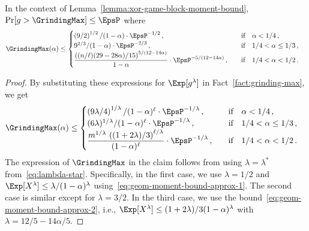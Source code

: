 \begin{corollary}
In the context of Lemma~\ref{lemma:xor-game-block-moment-bound}, $\Pr[g > \GrindingMax] \leq \EpsP$ where 
\begin{align*}
    \GrindingMax(\alpha) &\leq \begin{cases}
        \left( 9/2 \right)^{1/2}/(1-\alpha)\cdot \EpsP^{-1/2}
        \,,&\quad\text{if\quad $\alpha < 1/4$}\,, \\
        9^{2/3}/(1-\alpha)\cdot \EpsP^{-2/3}
        \,,&\quad\text{if\quad $1/4 < \alpha \leq 1/3$}\,, \\
        \dfrac{\left( (n/\ell) (29 - 28\alpha)/15\right)^{5/(12 - 14\alpha)}}{1-\alpha}\cdot \EpsP^{-5/(12 - 14\alpha)}
        \,,&\quad\text{if\quad $1/4 < \alpha < 1/2$}\,.
    \end{cases}
\end{align*}
\end{corollary}
\begin{proof}
By substituting these expressions for $\Exp[g^\lambda]$ in Fact~\ref{fact:grinding-max}, we get 
\begin{align*}
    \GrindingMax(\alpha) &\leq \begin{cases}
        \left( 9\lambda/4 \right)^{1/\lambda}/(1-\alpha)^\ell\cdot \EpsP^{-1/\lambda}
        \,,&\quad\text{if\quad $\alpha < 1/4$}\,, \\
        (6\lambda)^{1/\lambda}/(1-\alpha)^\ell\cdot \EpsP^{-1/\lambda}
        \,,&\quad\text{if\quad $1/4 < \alpha \leq 1/3$}\,, \\
        \dfrac{m^{1/\lambda}\, \left( (1 + 2\lambda)/3\right)^{\ell/\lambda}}{(1-\alpha)^\ell}\cdot \EpsP^{-1/\lambda}
        \,,&\quad\text{if\quad $1/4 < \alpha < 1/2$}\,.
    \end{cases}
\end{align*}
The expression of $\GrindingMax$ in the claim follows from using $\lambda = \lambda^*$ from~\eqref{eq:lambda-star}. 
Specifically, in the first case, we use $\lambda = 1/2$ and $\Exp[X^\lambda] \leq \lambda/(1-\alpha)^\lambda$ using~\eqref{eq:geom-moment-bound-approx-1}. 
The second case is similar except for $\lambda = 3/2$. 
In the third case, we use the bound~\eqref{eq:geom-moment-bound-approx-2}, i.e., 
$\Exp[X^\lambda] \leq (1+2\lambda)/3(1-\alpha)^\lambda$ with $\lambda = 12/5 - 14\alpha/5$. 
\end{proof}

